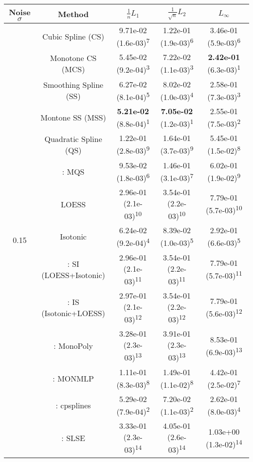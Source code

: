 \begin{tabular}{ccccc}
\toprule
Noise $\sigma$ & Method&$\frac 1n L_1$&$\frac{1}{\sqrt n}L_2$&$L_\infty$\tabularnewline
\midrule
\multirow{14}{*}{0.15}&Cubic Spline (CS)& 9.71e-02 (1.6e-03)\textsuperscript{7}& 1.22e-01 (1.9e-03)\textsuperscript{6}& 3.46e-01 (5.9e-03)\textsuperscript{6}\tabularnewline
&Monotone CS (MCS)& 5.45e-02 (9.2e-04)\textsuperscript{3}& 7.22e-02 (1.1e-03)\textsuperscript{3}& \textbf{2.42e-01} (6.3e-03)\textsuperscript{1}\tabularnewline
&Smoothing Spline (SS)& 6.27e-02 (8.1e-04)\textsuperscript{5}& 8.02e-02 (1.0e-03)\textsuperscript{4}& 2.58e-01 (7.3e-03)\textsuperscript{3}\tabularnewline
&Montone SS (MSS)& \textbf{5.21e-02} (8.8e-04)\textsuperscript{1}& \textbf{7.05e-02} (1.2e-03)\textsuperscript{1}& 2.55e-01 (7.5e-03)\textsuperscript{2}\tabularnewline
&Quadratic Spline (QS)& 1.22e-01 (2.8e-03)\textsuperscript{9}& 1.64e-01 (3.7e-03)\textsuperscript{9}& 5.45e-01 (1.5e-02)\textsuperscript{8}\tabularnewline
&\textcite{heMonotoneBsplineSmoothing1998}: MQS& 9.53e-02 (1.8e-03)\textsuperscript{6}& 1.46e-01 (3.1e-03)\textsuperscript{7}& 6.02e-01 (1.9e-02)\textsuperscript{9}\tabularnewline
&LOESS& 2.96e-01 (2.1e-03)\textsuperscript{10}& 3.54e-01 (2.2e-03)\textsuperscript{10}& 7.79e-01 (5.7e-03)\textsuperscript{10}\tabularnewline
&Isotonic& 6.24e-02 (9.2e-04)\textsuperscript{4}& 8.39e-02 (1.0e-03)\textsuperscript{5}& 2.92e-01 (6.6e-03)\textsuperscript{5}\tabularnewline
&\textcite{mammenEstimatingSmoothMonotone1991}: SI (LOESS+Isotonic)& 2.96e-01 (2.1e-03)\textsuperscript{11}& 3.54e-01 (2.2e-03)\textsuperscript{11}& 7.79e-01 (5.7e-03)\textsuperscript{11}\tabularnewline
&\textcite{mammenEstimatingSmoothMonotone1991}: IS (Isotonic+LOESS)& 2.97e-01 (2.1e-03)\textsuperscript{12}& 3.54e-01 (2.2e-03)\textsuperscript{12}& 7.79e-01 (5.6e-03)\textsuperscript{12}\tabularnewline
&\textcite{murrayFastFlexibleMethods2016a}: MonoPoly& 3.28e-01 (2.3e-03)\textsuperscript{13}& 3.91e-01 (2.3e-03)\textsuperscript{13}& 8.53e-01 (6.9e-03)\textsuperscript{13}\tabularnewline
&\textcite{cannonMonmlpMultilayerPerceptron2017}: MONMLP& 1.11e-01 (8.3e-03)\textsuperscript{8}& 1.49e-01 (1.1e-02)\textsuperscript{8}& 4.42e-01 (2.5e-02)\textsuperscript{7}\tabularnewline
&\textcite{navarro-garciaConstrainedSmoothingOutofrange2023}: cpsplines& 5.29e-02 (7.9e-04)\textsuperscript{2}& 7.20e-02 (1.1e-03)\textsuperscript{2}& 2.62e-01 (8.0e-03)\textsuperscript{4}\tabularnewline
&\textcite{groeneboomConfidenceIntervalsMonotone2023}: SLSE& 3.33e-01 (2.3e-03)\textsuperscript{14}& 4.05e-01 (2.6e-03)\textsuperscript{14}& 1.03e+00 (1.3e-02)\textsuperscript{14}\tabularnewline

\end{tabular}
